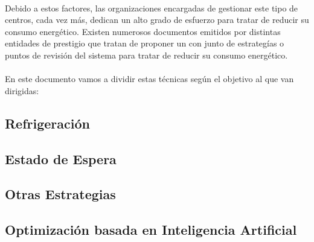 \documentclass[10pt]{article}
\begin{document}
		\paragraph{}
		Debido a estos factores, las organizaciones encargadas de gestionar este tipo de centros, cada vez más, dedican un alto grado de esfuerzo para tratar de reducir su consumo energético. Existen numerosos documentos emitidos por distintas entidades de prestigio que tratan de proponer un con junto de estrategías o puntos de revisión del sistema para tratar de reducir su consumo energético.


		\paragraph{}
		En este documento vamos a dividir estas técnicas según el objetivo al que van dirigidas:


		\subsection{Refrigeración}

			\paragraph{}


		\subsection{Estado de Espera}

			\paragraph{}


		\subsection{Otras Estrategias}

			\paragraph{}

		\subsection{Optimización basada en Inteligencia Artificial}

			\paragraph{}
\end{document}
